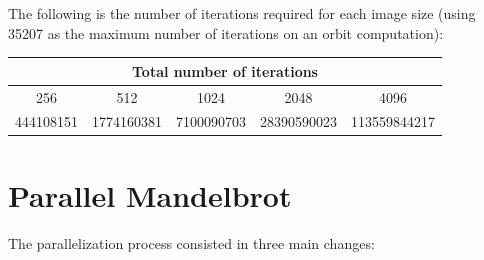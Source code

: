 \documentclass[unicode,11pt,a4paper,oneside,numbers=endperiod,openany]{scrartcl}
\begin{document}
    The following is the number of iterations required for each image size (using 35207 as the maximum number of iterations on an orbit computation):

    \begin{center}
        \begin{tabular}{||c | c | c | c | c ||} 
            \hline 
            \multicolumn{5}{|c|}{\textbf{Total number of iterations}} \\
            \hline
            256 & 512 & 1024 & 2048 & 4096 \\ [0.5ex] 
            \hline\hline
            444108151 & 1774160381 & 7100090703 & 28390590023 & 113559844217 \\
            \hline
        \end{tabular}
    \end{center}
    




\section{Parallel Mandelbrot }

    The parallelization process consisted in three main changes:
\end{document}
